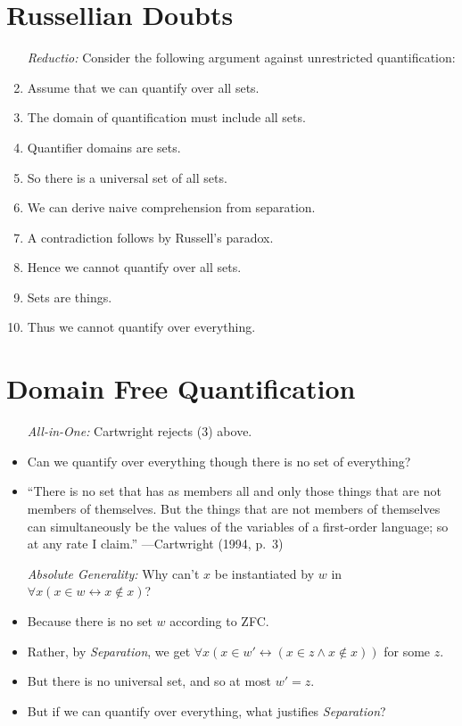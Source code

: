 \documentclass[a4paper, 11pt]{article} %
\begin{document}
\section*{Russellian Doubts}

\begin{enumerate}
  \item[\it Reductio:] Consider the following argument against unrestricted quantification:
    \item Assume that we can quantify over all sets.
    \item The domain of quantification must include all sets.
    \item Quantifier domains are sets.
    \item So there is a universal set of all sets.
    \item We can derive naive comprehension from separation.
    \item A contradiction follows by Russell's paradox.
    \item Hence we cannot quantify over all sets.
    \item Sets are things.
    \item Thus we cannot quantify over everything.
\end{enumerate}




\section*{Domain Free Quantification}

\begin{itemize}
  \item[\it All-in-One:] Cartwright rejects (3) above.
    \item Can we quantify over everything though there is no set of everything?
    \item ``There is no set that has as members all and only those things that are not members of themselves.
      But the things that are not members of themselves can simultaneously be the values of the variables of a first-order language; so at any rate I claim.'' ---Cartwright (1994, p.~3)
  \item[\it Absolute Generality:] Why can't $x$ be instantiated by $w$ in $\forall x(x \in w \leftrightarrow x \notin x)$? 
    \item Because there is no set $w$ according to ZFC. 
    \item Rather, by \textit{Separation}, we get $\forall x(x \in w' \leftrightarrow (x \in z \wedge x \notin x))$ for some $z$.
    \item But there is no universal set, and so at most $w' = z$.
    \item But if we can quantify over everything, what justifies \textit{Separation}?
\end{itemize}
\end{document}
